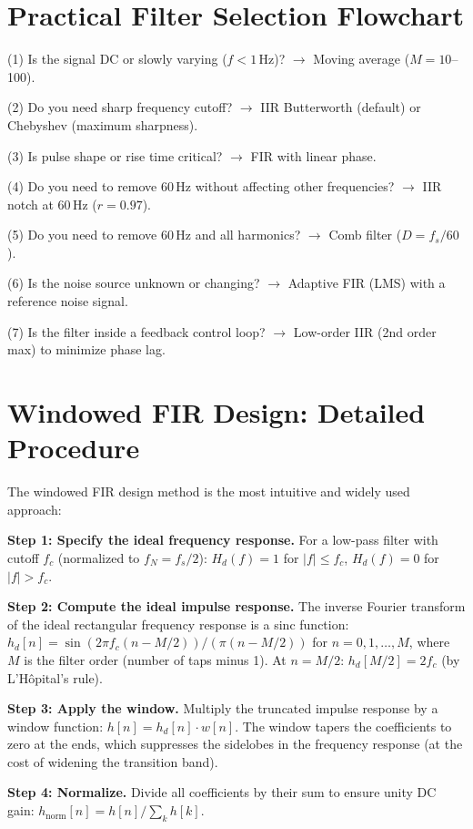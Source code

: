 \documentclass[11pt,letterpaper,twoside,openany]{book}
\begin{document}
\section{Practical Filter Selection Flowchart}
(1) Is the signal DC or slowly varying ($f < 1$\,Hz)? $\to$ Moving average ($M = 10$--100).

(2) Do you need sharp frequency cutoff? $\to$ IIR Butterworth (default) or Chebyshev (maximum sharpness).

(3) Is pulse shape or rise time critical? $\to$ FIR with linear phase.

(4) Do you need to remove 60\,Hz without affecting other frequencies? $\to$ IIR notch at 60\,Hz ($r = 0.97$).

(5) Do you need to remove 60\,Hz and all harmonics? $\to$ Comb filter ($D = f_s/60$).

(6) Is the noise source unknown or changing? $\to$ Adaptive FIR (LMS) with a reference noise signal.

(7) Is the filter inside a feedback control loop? $\to$ Low-order IIR (2nd order max) to minimize phase lag.
\section{Windowed FIR Design: Detailed Procedure}
The windowed FIR design method is the most intuitive and widely used approach:

\textbf{Step 1: Specify the ideal frequency response.} For a low-pass filter with cutoff $f_c$ (normalized to $f_N = f_s/2$): $H_d(f) = 1$ for $|f| \leq f_c$, $H_d(f) = 0$ for $|f| > f_c$.

\textbf{Step 2: Compute the ideal impulse response.} The inverse Fourier transform of the ideal rectangular frequency response is a sinc function: $h_d[n] = \sin(2\pi f_c (n - M/2)) / (\pi(n - M/2))$ for $n = 0, 1, \ldots, M$, where $M$ is the filter order (number of taps minus 1). At $n = M/2$: $h_d[M/2] = 2f_c$ (by L'H\^opital's rule).

\textbf{Step 3: Apply the window.} Multiply the truncated impulse response by a window function: $h[n] = h_d[n] \cdot w[n]$. The window tapers the coefficients to zero at the ends, which suppresses the sidelobes in the frequency response (at the cost of widening the transition band).

\textbf{Step 4: Normalize.} Divide all coefficients by their sum to ensure unity DC gain: $h_{\text{norm}}[n] = h[n] / \sum_k h[k]$.
\end{document}
